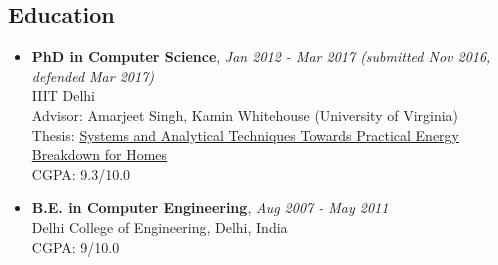 \documentclass[letter,10pt]{article}
\begin{document}
\subsection*{\textbf{Education}}
\vspace{-0.4em}
\begin{itemize}
\item[] 
    \textbf{PhD in Computer Science}, \hfill \textit{Jan 2012 - Mar 2017 (submitted Nov 2016, defended Mar 2017)}\\
	IIIT Delhi \\
	Advisor: Amarjeet Singh, Kamin Whitehouse (University of Virginia) \\
	Thesis: \href{https://nipunbatra.github.io/papers/batra_thesis.pdf}{Systems and Analytical Techniques Towards Practical Energy Breakdown for Homes}\\
	CGPA: 9.3/10.0
\item[]
	\textbf{B.E. in Computer Engineering}, \hfill \textit{Aug 2007 - May 2011}\\
	Delhi College of Engineering, Delhi, India \\
	CGPA: 9/10.0

\end{itemize}
\end{document}
